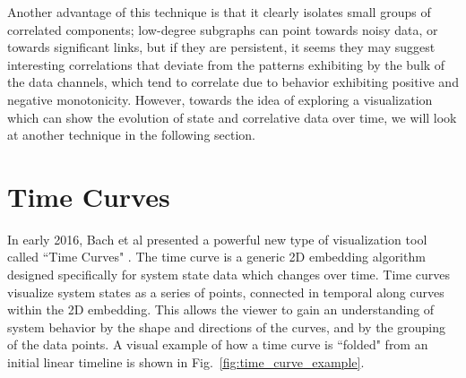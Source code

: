 Another advantage of this technique is that it clearly isolates small groups of correlated components; low-degree subgraphs can point towards noisy data, or towards significant links, but if they are persistent, it seems they may suggest interesting correlations that deviate from the patterns exhibiting by the bulk of the data channels, which tend to correlate due to behavior exhibiting positive and negative monotonicity. However, towards the idea of exploring a visualization which can show the evolution of state and correlative data over time, we will look at another technique in the following section.


\section{Time Curves}

In early 2016, Bach et al presented a powerful new type of visualization tool called ``Time Curves" \cite{bach2016time}. The time curve is a generic 2D embedding algorithm designed specifically for system state data which changes over time. Time curves visualize system states as a series of points, connected in temporal along curves within the 2D embedding. This allows the viewer to gain an understanding of system behavior by the shape and directions of the curves, and by the grouping of the data points. A visual example of how a time curve is ``folded" from an initial linear timeline is shown in Fig.~\ref{fig:time_curve_example}.

